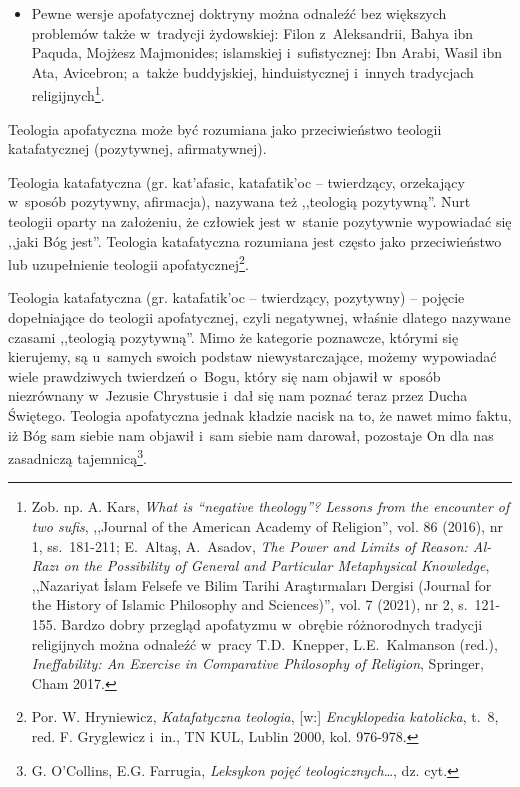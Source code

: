 \begin{itemize}
\item Pewne wersje apofatycznej doktryny można odnaleźć bez większych problemów także w~tradycji żydowskiej: Filon z~Aleksandrii, Bahya ibn Paquda, Mojżesz Majmonides; islamskiej i~sufistycznej: Ibn Arabi, Wasil ibn Ata, Avicebron; a~także buddyjskiej, hinduistycznej i~innych tradycjach religijnych\footnote{Zob. np. A. Kars, \textit{What is ``negative theology''? Lessons from the encounter of two sufis}, ,,Journal of the American Academy of Religion'', vol. 86 (2016), nr 1, ss.~181-211; E.~Altaş, A.~Asadov, \textit{The Power and Limits of Reason: Al-Razı on the Possibility of General and Particular Metaphysical Knowledge}, ,,Nazariyat İslam Felsefe ve Bilim Tarihi Araştırmaları Dergisi (Journal for the History of Islamic Philosophy and Sciences)'', vol. 7 (2021), nr 2, s.~121-155. Bardzo dobry przegląd apofatyzmu w~obrębie różnorodnych tradycji religijnych można odnaleźć w~pracy T.D.~Knepper, L.E.~Kalmanson (red.), \textit{Ineffability: An Exercise in Comparative Philosophy of Religion}, Springer, Cham 2017.}.
\end{itemize}
Teologia apofatyczna może być rozumiana jako przeciwieństwo teologii katafatycznej (pozytywnej, afirmatywnej).


\begin{defin}
Teologia katafatyczna (gr. \textgreek{kat'afasic}, \textgreek{katafatik'oc}  -- twierdzący, orzekający w~sposób pozytywny, afirmacja), nazywana też ,,teologią pozytywną''. Nurt teologii oparty na założeniu, że człowiek jest w~stanie pozytywnie wypowiadać się ,,jaki Bóg jest''. Teologia katafatyczna rozumiana jest często jako przeciwieństwo lub uzupełnienie teologii apofatycznej\footnote{Por. W. Hryniewicz, \textit{Katafatyczna teologia}, [w:] \textit{Encyklopedia katolicka}, t.~8, red. F. Gryglewicz i~in., TN KUL, Lublin 2000, kol. 976-978.}.
\end{defin}
\begin{defin}
Teologia katafatyczna (gr. \textgreek{katafatik'oc} -- twierdzący, pozytywny) -- pojęcie dopełniające do teologii apofatycznej, czyli negatywnej, właśnie dlatego nazywane czasami ,,teologią pozytywną''. Mimo że kategorie poznawcze, którymi się kierujemy, są u~samych swoich podstaw niewystarczające, możemy wypowiadać wiele prawdziwych twierdzeń o~Bogu, który się nam objawił w~sposób niezrównany w~Jezusie Chrystusie i~dał się nam poznać teraz przez Ducha Świętego. Teologia apofatyczna jednak kładzie nacisk na to, że nawet mimo faktu, iż Bóg sam siebie nam objawił i~sam siebie nam darował, pozostaje On dla nas zasadniczą tajemnicą\footnote{G. O'Collins, E.G. Farrugia, \textit{Leksykon pojęć teologicznych}\ldots, dz. cyt.}.
\end{defin}


